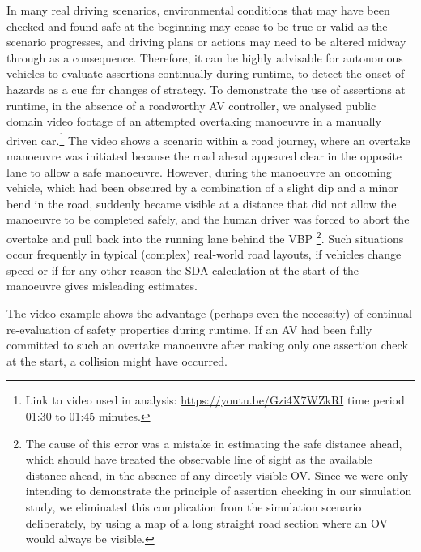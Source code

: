 In many real driving scenarios, environmental conditions that may have been checked and found safe at the beginning may cease to be true or valid as the scenario progresses, and driving plans or actions may need to be altered midway through as a consequence. Therefore, it can be highly advisable for autonomous vehicles to evaluate assertions continually during runtime, to detect the onset of hazards as a cue for changes of strategy.
%
To demonstrate the use of assertions at runtime, in the absence of a roadworthy AV controller, we analysed public domain video footage of an attempted overtaking manoeuvre in a manually driven car.\footnote{Link to video used in analysis: \url{https://youtu.be/Gzi4X7WZkRI} time period 01:30 to 01:45 minutes.} The video shows a scenario within a road journey, where an overtake manoeuvre was initiated because the road ahead appeared clear in the opposite lane to allow a safe manoeuvre. However, during the manoeuvre an oncoming vehicle, which had been obscured by a combination of a slight dip and a minor bend in the road, suddenly became visible at a distance that did not allow the manoeuvre to be completed safely, and the human driver was forced to abort the overtake and pull back into the running lane behind the VBP \footnote{The cause of this error was a mistake in estimating the safe distance ahead, which should have treated the observable line of sight as the available distance ahead, in the absence of any directly visible OV. Since we were only intending to demonstrate the principle of assertion checking in our simulation study, we eliminated this complication from the simulation scenario deliberately, by using a map of a long straight road section where an OV would always be visible.}. Such situations occur frequently in typical (complex) real-world road layouts, if vehicles change speed or if for any other reason the SDA calculation at the start of the manoeuvre gives misleading estimates. 

The video example shows the advantage (perhaps even the necessity) of continual re-evaluation of safety properties during runtime. If an AV had been fully committed to such an overtake manoeuvre after making only one assertion check at the start, a collision might have occurred.
%


